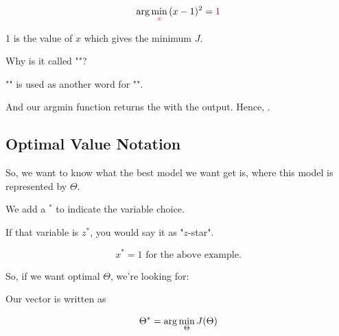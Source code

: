         \miniex
        
        \begin{equation}
            {\rm arg}\min_{\textcolor{red}{x}}{ (x-1)^2 } = \textcolor{red}{1}
        \end{equation}

        1 is the value of $x$ which gives the minimum $J$.\\

        \begin{clarification}
            Why is it called ""?

            "" is used as another word for "".

            And our argmin function returns the  with the  output. Hence,  .
        \end{clarification}
        
          

        

        \subsecdiv
        
    \subsection{Optimal Value Notation}
        
        So, we want to know what the best model we want get is, where this model is represented by $\Theta$.\\
        
        \begin{notation}
            We add a  $^*$ to indicate the  variable choice.
            
            If that variable is $z^*$, you would say it as "$z$-star".
        \end{notation}
        
        \miniex 
        
        \begin{equation}
            x^* = 1 \text{ for the above example.}
        \end{equation}
        
        So, if we want optimal $\Theta$, we're looking for:\\
        
        \begin{kequation}
        
            Our  vector is written as 
            
            \begin{equation*}
                \Theta^* = {\rm arg}\min_{ \Theta  }{  J(\Theta)  }
            \end{equation*}
        \end{kequation}
        



